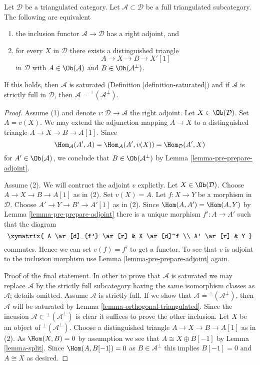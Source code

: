 \begin{lemma}
\label{lemma-right-adjoint}
Let $\mathcal{D}$ be a triangulated category. Let
$\mathcal{A} \subset \mathcal{D}$ be a full triangulated subcategory.
The following are equivalent
\begin{enumerate}
\item the inclusion functor $\mathcal{A} \to \mathcal{D}$
has a right adjoint, and
\item for every $X$ in $\mathcal{D}$ there exists a distinguished
triangle
$$
A \to X \to B \to X'[1]
$$
in $\mathcal{D}$ with $A \in \Ob(\mathcal{A})$ and
$B \in \Ob(\mathcal{A}^\perp)$.
\end{enumerate}
If this holds, then $\mathcal{A}$ is saturated
(Definition \ref{definition-saturated}) and if $\mathcal{A}$
is strictly full in $\mathcal{D}$, then
$\mathcal{A} = {}^\perp(\mathcal{A}^\perp)$.
\end{lemma}

\begin{proof}
Assume (1) and denote $v : \mathcal{D} \to \mathcal{A}$ the right adjoint.
Let $X \in \Ob(\mathcal{D})$. Set $A = v(X)$. We may extend the
adjunction mapping $A \to X$ to a distinguished triangle
$A \to X \to B \to A[1]$. Since
$$
\Hom_\mathcal{A}(A', A) =
\Hom_\mathcal{A}(A', v(X)) =
\Hom_\mathcal{D}(A', X)
$$
for $A' \in \Ob(\mathcal{A})$, we conclude that $B \in \Ob(\mathcal{A}^\perp)$
by Lemma \ref{lemma-pre-prepare-adjoint}.

\medskip\noindent
Assume (2). We will contruct the adjoint $v$ explictly.
Let $X \in \Ob(\mathcal{D})$. Choose $A \to X \to B \to A[1]$ as in (2).
Set $v(X) = A$. Let $f : X \to Y$ be a morphism in $\mathcal{D}$.
Choose $A' \to Y \to B' \to A'[1]$ as in (2). Since
$\Hom(A, A') = \Hom(A, Y)$ by Lemma \ref{lemma-pre-prepare-adjoint}
there is a unique morphism $f' : A \to A'$ such that the diagram
$$
\xymatrix{
A \ar[d]_{f'} \ar[r] & X \ar[d]^f \\
A' \ar[r] & Y
}
$$
commutes. Hence we can set $v(f) = f'$ to get a functor.
To see that $v$ is adjoint to the inclusion morphism use
Lemma \ref{lemma-pre-prepare-adjoint} again.

\medskip\noindent
Proof of the final statement. In other to prove that $\mathcal{A}$
is saturated we may replace $\mathcal{A}$ by the strictly full
subcategory having the same isomorphism classes as $\mathcal{A}$;
details omitted. Assume $\mathcal{A}$ is strictly full. If we show that
$\mathcal{A} = {}^\perp(\mathcal{A}^\perp)$, then
$\mathcal{A}$ will be saturated by Lemma \ref{lemma-orthogonal-triangulated}.
Since the incusion $\mathcal{A} \subset {}^\perp(\mathcal{A}^\perp)$
is clear it suffices to prove the other inclusion.
Let $X$ be an object of ${}^\perp(\mathcal{A}^\perp)$.
Choose a distinguished triangle $A \to X \to B \to A[1]$
as in (2). As $\Hom(X, B) = 0$ by assumption we see that
$A \cong X \oplus B[-1]$ by Lemma \ref{lemma-split}.
Since $\Hom(A, B[-1]) = 0$ as $B \in \mathcal{A}^\perp$
this implies $B[-1] = 0$ and $A \cong X$ as desired.
\end{proof}

